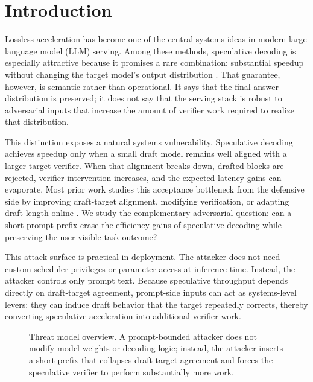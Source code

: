 \section{Introduction}

Lossless acceleration has become one of the central systems ideas in modern
large language model (LLM) serving. Among these methods, speculative decoding
is especially attractive because it promises a rare combination: substantial
speedup without changing the target model's output distribution
\citep{leviathan2023speculative}. That guarantee, however, is semantic rather
than operational. It says that the final answer distribution is preserved; it
does not say that the serving stack is robust to adversarial inputs that
increase the amount of verifier work required to realize that distribution.

This distinction exposes a natural systems vulnerability. Speculative decoding
achieves speedup only when a small draft model remains well aligned with a
larger target verifier. When that alignment breaks down, drafted blocks are
rejected, verifier intervention increases, and the expected latency gains can
evaporate. Most prior work studies this acceptance bottleneck from the
defensive side by improving draft-target alignment, modifying verification, or
adapting draft length online
\citep{liu2023online,goel2024direct,agrawal2024adaedl,bachmann2025judge,wang2025alignment,zhou2026hsd}.
We study the complementary adversarial question: can a short prompt prefix
erase the efficiency gains of speculative decoding while preserving the
user-visible task outcome?

This attack surface is practical in deployment. The attacker does not need
custom scheduler privileges or parameter access at inference time. Instead, the
attacker controls only prompt text. Because speculative throughput depends
directly on draft-target agreement, prompt-side inputs can act as systems-level
levers: they can induce draft behavior that the target repeatedly corrects,
thereby converting speculative acceleration into additional verifier work.

\begin{figure}[t]
\centering
{}
\caption{Threat model overview. A prompt-bounded attacker does not modify model
weights or decoding logic; instead, the attacker inserts a short prefix that
collapses draft-target agreement and forces the speculative verifier to perform
substantially more work.}
\label{fig:threat-model}
\end{figure}

